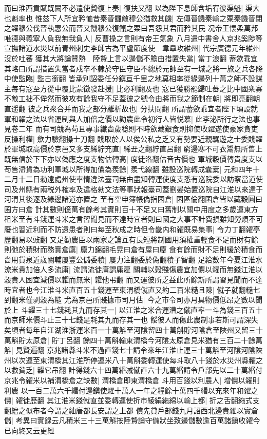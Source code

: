 而曰淮西貢賦既闕不必遣使贄復上奏|{
	復扶又翻}
以為陛下息師含垢宥彼渠魁|{
	渠大也魁率也}
惟兹下人所宜矜恤昔秦晉讎敵穆公猶救其饑|{
	左傳晉饑秦輸之粟秦饑晉閉之糴穆公伐晉執惠公而晉又饑穆公復餼之粟曰吾怨其君而矜其民}
况帝王懷柔萬邦唯德與義寧人負我無我負人|{
	反曹操之言則有帝王氣象}
八月遣中書舍人京兆奚陟等宣撫諸道水災以前青州刺史李師古為平盧節度使　韋臯攻維州|{
	代宗廣德元年維州沒於吐蕃}
獲其大將論贊熱　陸贄上言以邊儲不贍由措置失當|{
	當丁浪翻}
蓄歛乖宜其略曰所謂措置失當者戍卒不隸於守臣守臣不總於元帥至有一城之將一旅之兵各降中使監臨|{
	監古銜翻}
皆承别詔委任分鎭亘千里之地莫相率從緣邊列十萬之師不設謀主每有寇至方從中覆比蒙徵發赴援|{
	比必利翻及也}
寇已獲勝罷歸吐蕃之比中國衆寡不敵工拙不侔然而彼攻有餘我守不足蓋彼之號令由將而我之節制在朝|{
	將即亮翻朝直遥翻}
彼之兵衆合并而我之部分離析故也|{
	分扶問翻}
所謂蓄歛乖宜者陛下頃設就軍和糴之法以省運制與人加倍之價以勸農此令初行人皆悦慕|{
	此李泌所行之法也事見卷二年}
而有司競為苟且專事纎嗇歲稔則不時歛藏艱食則抑使收糴遂使豪家貪吏反操利權|{
	歛力驗翻操士刀翻}
賤取於人以俟公私之乏又有勢要近親羈遊之士委賤糴於軍城取高價於京邑又多支絺紵充直|{
	絺丑之翻紵直呂翻}
窮邊寒不可衣鬻無所售上既無信於下下亦以偽應之度支物估轉高|{
	度徒洛翻估音古價也}
軍城穀價轉貴度支以苟售滯貨為功利軍城以所得加價為羨餘|{
	羨弋線翻}
雖設巡院轉成囊槖|{
	元和四年十二月十二日勑遠處州使率情違法臺司無由盡知轉運使度支悉有巡院委以訪察當道使司及州縣有兩税外榷率及違格勑文法等事狀報臺司蓋劉晏始置巡院自江淮以來達于河渭其後逐及緣邊諸道亦置之}
至有空申簿帳偽指囷倉|{
	囷區倫翻囷倉皆以藏穀圓曰囷方曰倉}
計其數則億萬有餘考其實則百十不足又曰舊制以關中用度之多歲運東方租米至有斗錢運斗米之言習聞見而不達時宜者則曰國之大事不計費損雖知勞煩不可廢也習近利而不防遠患者則曰每至秋成之時但令畿内和糴既易集事|{
	令力丁翻糴亭歷翻易以䜴翻}
又足勸農臣以兩家之論互有長短將制國用須權重輕食不足而財有餘則弛於積財而務實倉廪|{
	廪力錦翻毛晃曰倉有屋曰廩}
食有餘而財不足則緩於積食而嗇用貨泉近歲關輔屢豐公儲委積|{
	屢力注翻委於偽翻積子智翻}
足給數年今夏江淮水潦米貴加倍人多流庸|{
	流謂流徙庸謂庸雇}
關輔以穀賤傷農宜加價以糴而無錢江淮以穀貴人困宜減價以糶而無米|{
	糶他弔翻}
而又運彼所乏益此所餘斯所謂習見聞而不達時宜者也今江淮斗米直百五十錢運至東渭橋僦直又約二百米糙且陳|{
	僦子就翻糙七到翻米僅剥穀為糙}
尤為京邑所賤據市司月估|{
	今之市令司亦月具物價低昂之數以聞於上}
斗糶三十七錢耗其九而存其一|{
	以江淮之米合運漕之僦直率一斗為錢三百五十而京師米價斗止三十七錢是耗其九而存其一也}
餒彼人而傷此農制事若斯可謂深失矣頃者每年自江湖淮浙運米百一十萬斛至河隂留四十萬斛貯河隂倉至陜州又留三十萬斛貯太原倉|{
	貯丁呂翻}
餘四十萬斛輸東渭橋今河隂太原倉見米猶有三百二十餘萬斛|{
	見賢遍翻}
京兆諸縣斗米不過直錢七十請令來年江淮止運三十萬斛至河隂河隂陜州以次運至東渭橋其江淮所停運米八十萬斛委轉運使每斗取八十錢於水災州縣糶之以救貧乏|{
	糶它吊翻}
計得錢六十四萬緡减僦直六十九萬緡請令戶部先以二十萬緡付京兆令糴米以補渭橋倉之缺數|{
	渭橋倉即東渭橋倉}
斗用百錢以利農人|{
	增價以糴則利農}
以一百二萬六千緡付邊鎭使糴十萬人一年之糧餘十萬四千緡以充來年和糴之價|{
	糴徒歷翻}
其江淮米錢僦直並委轉運使折市綾絹絁綿以輸上都|{
	折之舌翻絁式支翻繒之似布者今謂之紬唐都長安謂之上都}
償先貸戶部錢九月詔西北邊貴糴以實倉儲|{
	考異曰實録云凡積米三十三萬斛按陸贄論守備狀坐致邊儲數逾百萬諸鎭收糴今已向終又云更經}


